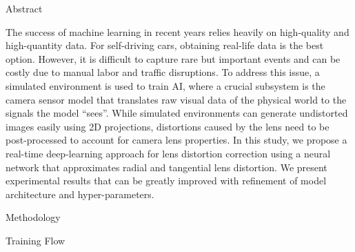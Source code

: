 \documentclass[final]{beamer}
\newlength{\colwidth}
\begin{document}
\begin{frame}[t]
\begin{columns}[t]
\begin{column}{\colwidth}
      \begin{block}{Abstract}

        The success of machine learning in recent years relies heavily on high-quality and high-quantity data. For self-driving cars, obtaining real-life data is the best option. However, it is difficult to capture rare but important events and can be costly due to manual labor and traffic disruptions. To address this issue, a simulated environment is used to train AI, where a crucial subsystem is the camera sensor model that translates raw visual data of the physical world to the signals the model “sees”. While simulated environments can generate undistorted images easily using 2D projections, distortions caused by the lens need to be post-processed to account for camera lens properties. In this study, we propose a real-time deep-learning approach for lens distortion correction using a neural network that approximates radial and tangential lens distortion. We present experimental results that can be greatly improved with refinement of model architecture and hyper-parameters.


      \end{block}

      \begin{block}{Methodology}


      \end{block}

      \begin{block}{Training Flow}

      \end{block}


\end{column}
\end{columns}
\end{frame}
\end{document}
